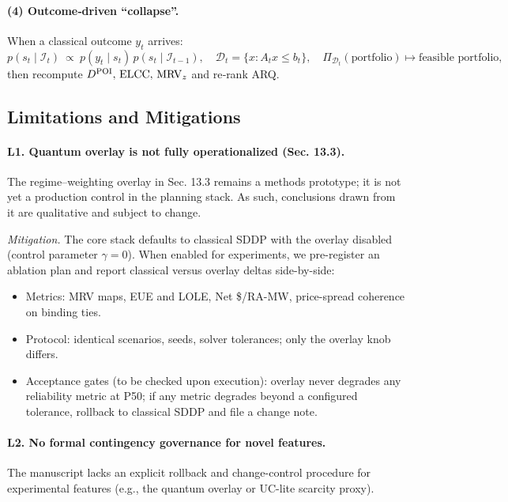 \documentclass[11pt]{article}
\newcommand{\ELCC}{\ensuremath{\mathrm{ELCC}}}
\newcommand{\MRV}{\ensuremath{\mathrm{MRV}}}
\numberwithin{equation}{section}
\theoremstyle{definition}
\theoremstyle{remark}
\begin{document}
\paragraph{(4) Outcome‑driven “collapse”.}
When a classical outcome \(y_t\) arrives:
\[
  p(s_t\mid \mathcal I_t)\ \propto\ p(y_t\mid s_t)\,p(s_t\mid \mathcal I_{t-1}),\quad
  \mathcal{D}_t=\{x: A_t x\le b_t\},\quad
  \Pi_{\mathcal{D}_t}(\text{portfolio})\mapsto \text{feasible portfolio},
\]
then recompute \(\Ddel,\,\ELCC,\,\MRV_{z}\) and re‑rank ARQ.

\subsection{Limitations and Mitigations}
\label{sec:limits}

\paragraph{L1. Quantum overlay is not fully operationalized (Sec. 13.3).}
The regime–weighting overlay in Sec. 13.3 remains a methods prototype; it is not yet a production control in the planning stack. As such, conclusions drawn from it are qualitative and subject to change.

\emph{Mitigation.} The core stack defaults to classical SDDP with the overlay disabled (control parameter $\gamma=0$). When enabled for experiments, we pre-register an ablation plan and report classical versus overlay deltas side-by-side:
\begin{itemize}[leftmargin=1.2em]
  \item Metrics: MRV maps, EUE and LOLE, Net \$/RA-MW, price-spread coherence on binding ties.
  \item Protocol: identical scenarios, seeds, solver tolerances; only the overlay knob differs.
  \item Acceptance gates (to be checked upon execution): overlay never degrades any reliability metric at P50; if any metric degrades beyond a configured tolerance, rollback to classical SDDP and file a change note.
\end{itemize}

\paragraph{L2. No formal contingency governance for novel features.}
The manuscript lacks an explicit rollback and change-control procedure for experimental features (e.g., the quantum overlay or UC-lite scarcity proxy).
\end{document}
